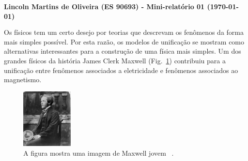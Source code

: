 \documentclass[a4wide]{report}
\begin{document}
\noindent
{\bf Lincoln Martins de Oliveira (ES 90693)  - Mini-relatório 01 (\today)}

\vspace{0.5cm}


	Os físicos tem um certo desejo por teorias que descrevam os fenômenos da forma mais simples possível. Por esta razão, os modelos de unificação se mostram como alternativas interessantes para a construção de uma física mais simples.
Um dos grandes físicos da história James Clerk Maxwell (Fig.~\ref{pequeno_maxwell}) contribuiu para a unificação entre fenômenos associados a eletricidade e fenômenos associados ao magnetismo.




\begin{figure}[h]
\centering
\includegraphics[width=0.23\textwidth]{figure_2}
\caption{A figura mostra uma imagem de Maxwell jovem ~\cite{maxjovem}.}
\label{pequeno_maxwell}
\end{figure}


\end{document}
